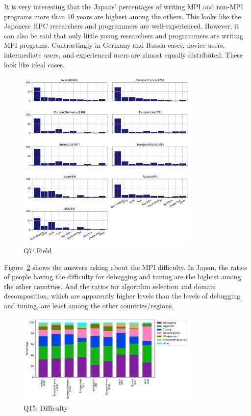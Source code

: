 \documentclass[submit,techrep,noauthor,english]{ipsj}
\begin{document}
It is very interesting that the Japans' percentages of writing MPI and
non-MPI programs more than 10 years are highest among the
others. This looks like the Japanese HPC researchers and programmers
are well-experienced. However, it can also be said that only little young
researchers and programmers are writing MPI programs. Contrastingly
in Germany and Russia cases, novice users, intermediate users, and
experienced users are almost equally distributed.  These look like
ideal cases. 

\begin{figure}[htb]
\begin{center}
\includegraphics[width=9cm]{../pdfs/Q7.pdf}
  \vspace{-8mm}
\caption{Q7: Field}
\label{fig:q7}
\end{center}
\end{figure}

Figure~\ref{fig:q15} shows the answers asking about the MPI
difficulty. In Japan, the ratios of people having the difficulty for
debugging and tuning are the highest among the other countries. And
the ratios for algorithm selection and domain decomposition, which
are apparently higher levels than the levels of debugging and tuning,
are least among the other countries/regions.

\begin{figure}[htb]
\begin{center}
\includegraphics[width=9cm]{../pdfs/Q15.pdf}
  \vspace{-8mm}
\caption{Q15: Difficulty}
\label{fig:q15}
\end{center}
\end{figure}
\end{document}
